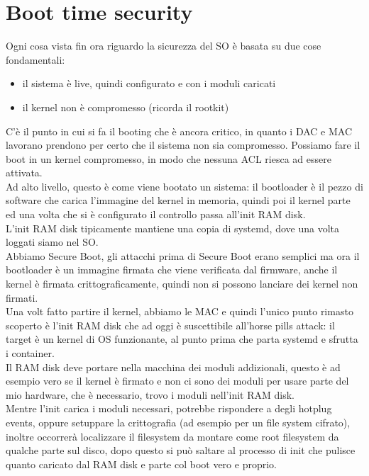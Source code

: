 \documentclass[12pt, oneside]{extbook} %
\begin{document}
\section{Boot time security}
Ogni cosa vista fin ora riguardo la sicurezza del SO è basata su due cose fondamentali:
\begin{itemize}
\item il sistema è live, quindi configurato e con i moduli caricati
\item il kernel non è compromesso (ricorda il rootkit)
\end{itemize}
C'è il punto in cui si fa il booting che è ancora critico, in quanto i DAC e MAC lavorano prendono per certo che il sistema non sia compromesso. Possiamo fare il boot in un kernel compromesso, in modo che nessuna ACL riesca ad essere attivata.\\Ad alto livello, questo è come viene bootato un sistema:
il bootloader è il pezzo di software che carica l'immagine del kernel in memoria, quindi poi il kernel parte ed una volta che si è configurato il controllo passa all'init RAM disk.\\L'init RAM disk tipicamente mantiene una copia di systemd, dove una volta loggati siamo nel SO.\\Abbiamo Secure Boot, gli attacchi prima di Secure Boot erano semplici ma ora il bootloader è un immagine firmata che viene verificata dal firmware, anche il kernel è firmata crittograficamente, quindi non si possono lanciare dei kernel non firmati.\\Una volt fatto partire il kernel, abbiamo le MAC e quindi l'unico punto rimasto scoperto è l'init RAM disk che ad oggi è suscettibile all'horse pills attack: il target è un kernel di OS funzionante, al punto prima che parta systemd e sfrutta i container.\\ Il RAM disk deve portare nella macchina dei moduli addizionali, questo è ad esempio vero se il kernel è firmato e non ci sono dei moduli per usare parte del mio hardware, che è necessario, trovo i moduli nell'init RAM disk.\\Mentre l'init carica i moduli necessari, potrebbe rispondere a degli hotplug events, oppure setuppare la crittografia (ad esempio per un file system cifrato), inoltre occorrerà localizzare il filesystem da montare come root filesystem da qualche parte sul disco, dopo questo si può saltare al processo di init che pulisce quanto caricato dal RAM disk e parte col boot vero e proprio.
\end{document}
